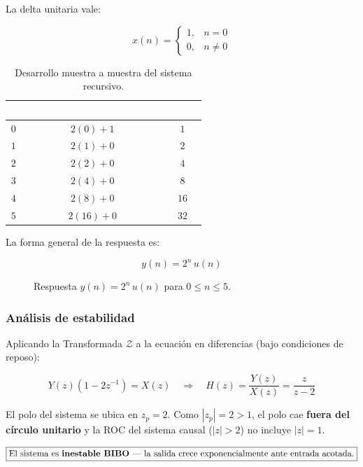 \documentclass[../Main_Include.tex]{subfiles}
\begin{document}
La delta unitaria vale:

\[
    x(n) = \begin{cases} 1, & n = 0 \\ 0, & n \neq 0 \end{cases}
\]

\begin{table}[H]
\centering
\renewcommand{\arraystretch}{1.4}
\begin{tabular}{ccc}
\toprule
\rowcolor{azulprinc}
\textcolor{white}{\textbf{$n$}} &
\textcolor{white}{\textbf{$y(n) = 2\,y(n-1) + x(n)$}} &
\textcolor{white}{\textbf{$y(n)$}} \\
\midrule
\rowcolor{grisclaro}
$0$ & $2(0) + 1$ & $1$ \\
$1$ & $2(1) + 0$ & $2$ \\
\rowcolor{grisclaro}
$2$ & $2(2) + 0$ & $4$ \\
$3$ & $2(4) + 0$ & $8$ \\
\rowcolor{grisclaro}
$4$ & $2(8) + 0$ & $16$ \\
$5$ & $2(16) + 0$ & $32$ \\
\bottomrule
\end{tabular}
\caption{Desarrollo muestra a muestra del sistema recursivo.}
\end{table}

La forma general de la respuesta es:

\[
    \boxed{y(n) = 2^n\, u(n)}
\]

\begin{figure}[H]
    \centering
    \caption{Respuesta $y(n) = 2^n\,u(n)$ para $0 \le n \le 5$.}
\end{figure}

\subsubsection*{Análisis de estabilidad}

Aplicando la Transformada $\mathcal{Z}$ a la ecuación en diferencias
(bajo condiciones de reposo):

\[
    Y(z)\!\left(1 - 2z^{-1}\right) = X(z)
    \quad\Longrightarrow\quad
    H(z) = \frac{Y(z)}{X(z)} = \frac{z}{z - 2}
\]

El polo del sistema se ubica en $z_p = 2$. Como $|z_p| = 2 > 1$,
el polo cae \textbf{fuera del círculo unitario} y la ROC del sistema
causal ($|z| > 2$) no incluye $|z| = 1$.

\[
    \boxed{\text{El sistema es \textbf{inestable BIBO} —
    la salida crece exponencialmente ante entrada acotada.}}
\]
\end{document}
